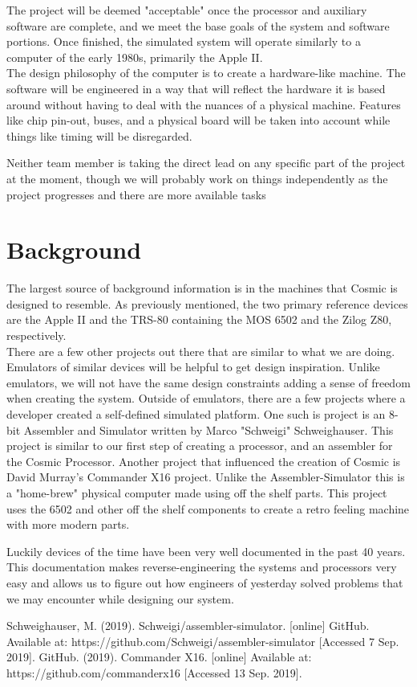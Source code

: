 \documentclass[conference]{IEEEtran}
\begin{document}
The project will be deemed "acceptable" once the processor and auxiliary software are complete, and we meet the base goals of the system and software portions. Once finished, the simulated system will operate similarly to a computer of the early 1980s, primarily the Apple II.\\ 

The design philosophy of the computer is to create a hardware-like machine. The software will be engineered in a way that will reflect the hardware it is based around without having to deal with the nuances of a physical machine. Features like chip pin-out, buses, and a physical board will be taken into account while things like timing will be disregarded. 

Neither team member is taking the direct lead on any specific part of the project at the moment, though we will probably work on things independently as the project progresses and there are more available tasks

\section{Background}

The largest source of background information is in the machines that Cosmic is designed to resemble. As previously mentioned, the two primary reference devices are the Apple II and the TRS-80 containing the MOS 6502 and the Zilog Z80, respectively. \\

There are a few other projects out there that are similar to what we are doing. Emulators of similar devices will be helpful to get design inspiration. Unlike emulators, we will not have the same design constraints adding a sense of freedom when creating the system.  Outside of emulators, there are a few projects where a developer created a self-defined simulated platform. One such is project is an 8-bit Assembler and Simulator written by Marco "Schweigi" Schweighauser\cite{b1}. This project is similar to our first step of creating a processor, and an assembler for the Cosmic Processor. Another project that influenced the creation of Cosmic is David Murray's Commander X16 project\cite{b2}. Unlike the Assembler-Simulator this is a "home-brew" physical computer made using off the shelf parts. This project uses the 6502 and other off the shelf components to create a retro feeling machine with more modern parts. 

    Luckily devices of the time have been very well documented in the past 40 years. This documentation makes
reverse-engineering the systems and processors very easy and allows us to figure out how
engineers of yesterday solved problems that we may encounter while designing our system. 


\begin{thebibliography}{00}
 Schweighauser, M. (2019). Schweigi/assembler-simulator. [online] GitHub. Available at: https://github.com/Schweigi/assembler-simulator [Accessed 7 Sep. 2019].
GitHub. (2019). Commander X16. [online] Available at: https://github.com/commanderx16 [Accessed 13 Sep. 2019].

\end{thebibliography}
\end{document}
